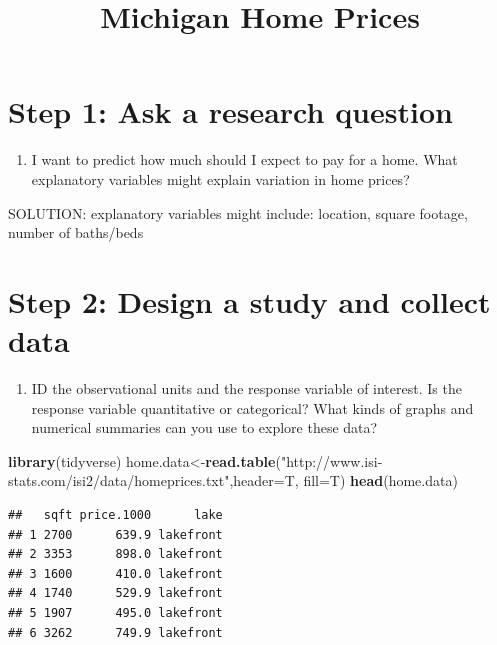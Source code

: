 \documentclass[]{article}
\title{Michigan Home Prices}
\author{}
\date{}
\newenvironment{Shaded}{\begin{snugshade}}{\end{snugshade}}
\newcommand{\KeywordTok}[1]{\textcolor[rgb]{0.13,0.29,0.53}{\textbf{#1}}}
\newcommand{\DataTypeTok}[1]{\textcolor[rgb]{0.13,0.29,0.53}{#1}}
\newcommand{\StringTok}[1]{\textcolor[rgb]{0.31,0.60,0.02}{#1}}
\newcommand{\NormalTok}[1]{#1}
\providecommand{\tightlist}{%
  \setlength{\itemsep}{0pt}\setlength{\parskip}{0pt}}
\begin{document}
\maketitle

\section{Step 1: Ask a research
question}\label{step-1-ask-a-research-question}

\begin{enumerate}
\def\labelenumi{\arabic{enumi}.}
\tightlist
\item
  I want to predict how much should I expect to pay for a home. What
  explanatory variables might explain variation in home prices?
\end{enumerate}

SOLUTION: explanatory variables might include: location, square footage,
number of baths/beds

\section{Step 2: Design a study and collect
data}\label{step-2-design-a-study-and-collect-data}

\begin{enumerate}
\def\labelenumi{\arabic{enumi}.}
\setcounter{enumi}{1}
\tightlist
\item
  ID the observational units and the response variable of interest. Is
  the response variable quantitative or categorical? What kinds of
  graphs and numerical summaries can you use to explore these data?
\end{enumerate}

\begin{Shaded}
\begin{Highlighting}[]
\KeywordTok{library}\NormalTok{(tidyverse)}
\NormalTok{home.data<-}\KeywordTok{read.table}\NormalTok{(}\StringTok{"http://www.isi-stats.com/isi2/data/homeprices.txt"}\NormalTok{,}\DataTypeTok{header=}\NormalTok{T, }\DataTypeTok{fill=}\NormalTok{T)}
\KeywordTok{head}\NormalTok{(home.data)}
\end{Highlighting}
\end{Shaded}

\begin{verbatim}
##   sqft price.1000      lake
## 1 2700      639.9 lakefront
## 2 3353      898.0 lakefront
## 3 1600      410.0 lakefront
## 4 1740      529.9 lakefront
## 5 1907      495.0 lakefront
## 6 3262      749.9 lakefront
\end{verbatim}
\end{document}
